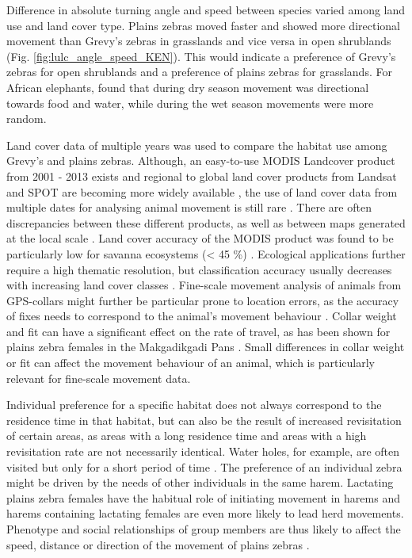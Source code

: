 \documentclass[12pt,a4paper, twoside, english]{article}
\begin{document}
Difference in absolute turning angle and speed between species varied among land use and land cover type. Plains zebras moved faster and showed more directional movement than Grevy's zebras in grasslands and vice versa in open shrublands (Fig. \ref{fig:lulc_angle_speed_KEN}). This would indicate a preference of Grevy's zebras for open shrublands and a preference of plains zebras for grasslands. For African elephants, \cite{Wittemyer2008a} found that during dry season movement was directional towards food and water, while during the wet season movements were more random.

Land cover data of multiple years was used to compare the habitat use among Grevy's and plains zebras. Although, an easy-to-use MODIS Landcover product from 2001 - 2013 exists and regional to global land cover products from Landsat and SPOT are becoming more widely available \citep{Nagendra2013}, the use of land cover data from multiple dates for analysing animal movement is still rare \citep{Neumann2015a}. There are often discrepancies between these different products, as well as between maps generated at the local scale \citep{DeFries2005}. Land cover accuracy of the MODIS product was found to be particularly low for savanna ecosystems (< 45 \%) \citep{Cohen2006}. Ecological applications further require a high thematic resolution, but classification accuracy usually decreases with increasing land cover classes \citep{Neumann2015a}. Fine-scale movement analysis of animals from GPS-collars might further be particular prone to location errors, as the accuracy of fixes needs to correspond to the animal’s movement behaviour \citep{Bjorneraas2010}. Collar weight and fit can have a significant effect on the rate of travel, as has been shown for plains zebra females in the Makgadikgadi Pans \citep{Brooks2008a}. Small differences in collar weight or fit can affect the movement behaviour of an animal, which is particularly relevant for fine-scale movement data.

Individual preference for a specific habitat does not always correspond to the residence time in that habitat, but can also be the result of increased revisitation of certain areas, as areas with a long residence time and areas with a high revisitation rate are not necessarily identical. Water holes, for example, are often visited but only for a short period of time \citep{VanMoorter2016}. The  preference of an individual zebra might be driven by the needs of other individuals in the same harem. Lactating plains zebra females have the habitual role of initiating movement in harems and harems containing lactating females are even more likely to lead herd movements. Phenotype and social relationships of group members are thus likely to affect the speed, distance or direction of the movement of plains zebras \citep{Fischhoff2007b}.
\end{document}
